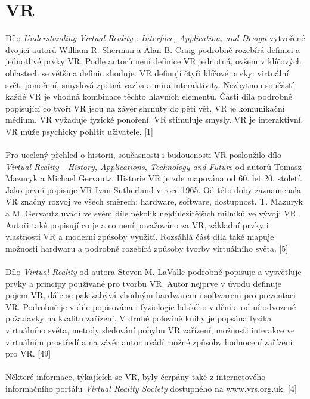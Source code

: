 \documentclass[a4paper, 12pt]{report}
\begin{document}
\section{VR}
Dílo \textit{Understanding Virtual Reality : Interface, Application, and Design} vytvořené dvojicí autorů William R. Sherman a Alan B. Craig podrobně rozebírá definici a jednotlivé prvky VR. Podle autorů není definice VR jednotná, ovšem v klíčových oblastech se většina definic shoduje. VR definují čtyři klíčové prvky: virtuální svět, ponoření, smyslová zpětná vazba a míra interaktivity. Nezbytnou součástí každé VR je vhodná kombinace těchto hlavních elementů. Části díla podrobně popisující co tvoří VR jsou na závěr shrnuty do pěti vět. VR je komunikační médium. VR vyžaduje fyzické ponoření. VR stimuluje smysly. VR je interaktivní. VR může psychicky pohltit uživatele. [1]\\
\\
Pro ucelený přehled o historii, současnosti i budoucnosti VR posloužilo dílo \textit{Virtual Reality - History, Applications, Technology and Future} od autorů Tomasz Mazuryk a Michael Gervautz. Historie VR je zde mapována od 60. let 20. století. Jako první popisuje VR Ivan Sutherland v roce 1965. Od této doby zaznamenala VR značný rozvoj ve všech směrech: hardware, software, dostupnost. T. Mazuryk a M. Gervautz uvádí ve svém díle několik nejdůležitějších milníků ve vývoji VR. Autoři také popisují co je a co není považováno za VR, základní prvky i vlastnosti VR a moderní způsoby využití. Rozsáhlá část díla také mapuje možnosti hardwaru a podrobně rozebírá způsoby tvorby virtuálního světa. [5]\\
\\
Dílo \textit{Virtual Reality} od autora Steven M. LaValle podrobně popisuje a vysvětluje prvky a principy používané pro tvorbu VR. Autor nejprve v úvodu definuje pojem VR, dále se pak zabývá vhodným hardwarem i softwarem pro prezentaci VR. Podrobně je v díle popisována i fyziologie lidského vidění a od ní odvozené požadavky na kvalitu zařízení. V druhé polovině knihy je popsána fyzika virtuálního světa, metody sledování pohybu VR zařízení, možnosti interakce ve virtuálním prostředí a na závěr autor uvádí možné způsoby hodnocení zařízení pro VR. [49]\\
\\
Některé informace, týkajících se VR, byly čerpány také z internetového informačního portálu \textit{Virtual Reality Society} dostupného na www.vrs.org.uk. [4]\\
\\
\end{document}
